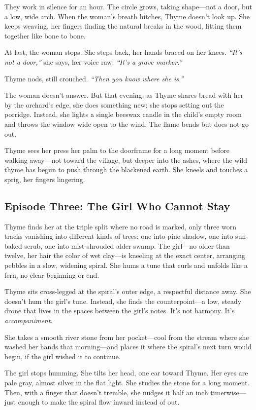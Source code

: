 \documentclass[11pt]{book}
\begin{document}
They work in silence for an hour. The circle grows, taking shape---not a door, but a low, wide arch. When the woman's breath hitches, Thyme doesn't look up. She keeps weaving, her fingers finding the natural breaks in the wood, fitting them together like bone to bone.

At last, the woman stops. She steps back, her hands braced on her knees. \textit{``It's not a door,'' } she says, her voice raw. \textit{``It's a grave marker.''}

Thyme nods, still crouched. \textit{``Then you know where she is.''}

The woman doesn't answer. But that evening, as Thyme shares bread with her by the orchard's edge, she does something new: she stops setting out the porridge. Instead, she lights a single beeswax candle in the child's empty room and throws the window wide open to the wind. The flame bends but does not go out.

Thyme sees her press her palm to the doorframe for a long moment before walking away---not toward the village, but deeper into the ashes, where the wild thyme has begun to push through the blackened earth. She kneels and touches a sprig, her fingers lingering.

\subsection*{Episode Three: The Girl Who Cannot Stay}
Thyme finds her at the triple split where no road is marked, only three worn tracks vanishing into different kinds of trees: one into pine shadow, one into sun-baked scrub, one into mist-shrouded alder swamp. The girl---no older than twelve, her hair the color of wet clay---is kneeling at the exact center, arranging pebbles in a slow, widening spiral. She hums a tune that curls and unfolds like a fern, no clear beginning or end.

Thyme sits cross-legged at the spiral's outer edge, a respectful distance away. She doesn't hum the girl's tune. Instead, she finds the counterpoint---a low, steady drone that lives in the spaces between the girl's notes. It's not harmony. It's \textit{accompaniment}.

She takes a smooth river stone from her pocket---cool from the stream where she washed her hands that morning---and places it where the spiral's next turn would begin, if the girl wished it to continue.

The girl stops humming. She tilts her head, one ear toward Thyme. Her eyes are pale gray, almost silver in the flat light. She studies the stone for a long moment. Then, with a finger that doesn't tremble, she nudges it half an inch timerwise---just enough to make the spiral flow inward instead of out.
\end{document}
